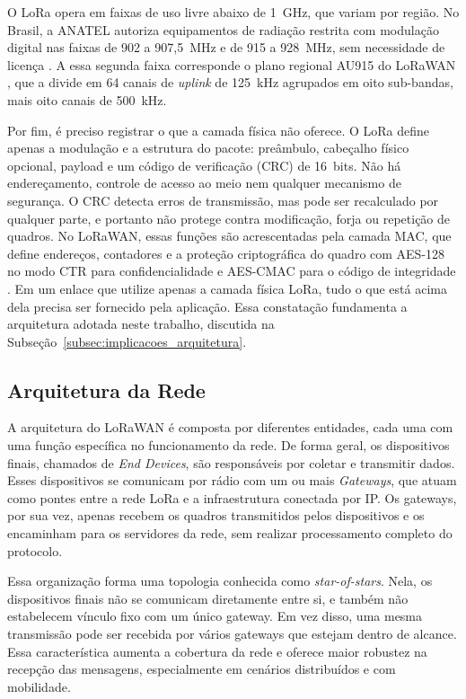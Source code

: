 O LoRa opera em faixas de uso livre abaixo de 1~GHz, que variam por região. No Brasil, a ANATEL autoriza equipamentos de radiação restrita com modulação digital nas faixas de 902 a 907,5~MHz e de 915 a 928~MHz, sem necessidade de licença \cite{anatel_radiacao_restrita}. A essa segunda faixa corresponde o plano regional AU915 do LoRaWAN \cite{lorawan_rp002}, que a divide em 64 canais de \textit{uplink} de 125~kHz agrupados em oito sub-bandas, mais oito canais de 500~kHz.

Por fim, é preciso registrar o que a camada física não oferece. O LoRa define apenas a modulação e a estrutura do pacote: preâmbulo, cabeçalho físico opcional, payload e um código de verificação (CRC) de 16~bits. Não há endereçamento, controle de acesso ao meio nem qualquer mecanismo de segurança. O CRC detecta erros de transmissão, mas pode ser recalculado por qualquer parte, e portanto não protege contra modificação, forja ou repetição de quadros. No LoRaWAN, essas funções são acrescentadas pela camada MAC, que define endereços, contadores e a proteção criptográfica do quadro com AES-128 no modo CTR para confidencialidade e AES-CMAC para o código de integridade \cite{lorawan104}. Em um enlace que utilize apenas a camada física LoRa, tudo o que está acima dela precisa ser fornecido pela aplicação. Essa constatação fundamenta a arquitetura adotada neste trabalho, discutida na Subseção~\ref{subsec:implicacoes_arquitetura}.



\subsection{Arquitetura da Rede}

A arquitetura do LoRaWAN é composta por diferentes entidades, cada uma com uma função específica no funcionamento da rede. De forma geral, os dispositivos finais, chamados de \textit{End Devices}, são responsáveis por coletar e transmitir dados. Esses dispositivos se comunicam por rádio com um ou mais \textit{Gateways}, que atuam como pontes entre a rede LoRa e a infraestrutura conectada por IP. Os gateways, por sua vez, apenas recebem os quadros transmitidos pelos dispositivos e os encaminham para os servidores da rede, sem realizar processamento completo do protocolo. \cite{hessel2023lorawan}

Essa organização forma uma topologia conhecida como \textit{star-of-stars}. Nela, os dispositivos finais não se comunicam diretamente entre si, e também não estabelecem vínculo fixo com um único gateway. Em vez disso, uma mesma transmissão pode ser recebida por vários gateways que estejam dentro de alcance. Essa característica aumenta a cobertura da rede e oferece maior robustez na recepção das mensagens, especialmente em cenários distribuídos e com mobilidade.

